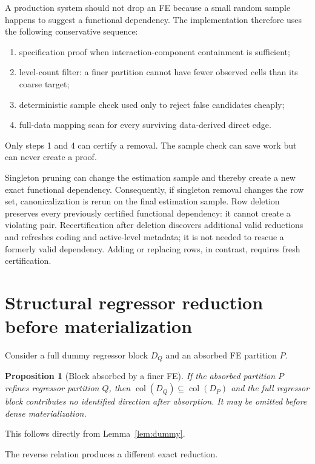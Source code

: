 \documentclass[11pt]{article}
\newtheorem{proposition}[theorem]{Proposition}
\theoremstyle{definition}
\newcommand{\col}{\operatorname{col}}
\newcommand{\1}{\mathbf{1}}
\begin{document}
A production system should not drop an FE because a small random sample happens to suggest a functional dependency. The implementation therefore uses the following conservative sequence:
\begin{enumerate}[label=\arabic*.]
  \item specification proof when interaction-component containment is sufficient;
  \item level-count filter: a finer partition cannot have fewer observed cells than its coarse target;
  \item deterministic sample check used only to reject false candidates cheaply;
  \item full-data mapping scan for every surviving data-derived direct edge.
\end{enumerate}
Only steps 1 and 4 can certify a removal. The sample check can save work but can never create a proof.

Singleton pruning can change the estimation sample and thereby create a new exact functional dependency. Consequently, if singleton removal changes the row set, canonicalization is rerun on the final estimation sample. Row deletion preserves every previously certified functional dependency: it cannot create a violating pair. Recertification after deletion discovers additional valid reductions and refreshes coding and active-level metadata; it is not needed to rescue a formerly valid dependency. Adding or replacing rows, in contrast, requires fresh certification.

\section{Structural regressor reduction before materialization}

Consider a full dummy regressor block $D_Q$ and an absorbed FE partition $P$.

\begin{proposition}[Block absorbed by a finer FE]\label{prop:absorb}
If the absorbed partition $P$ refines regressor partition $Q$, then $\col(D_Q)\subseteq\col(D_P)$ and the full regressor block contributes no identified direction after absorption. It may be omitted before dense materialization.
\end{proposition}
This follows directly from Lemma~\ref{lem:dummy}.

The reverse relation produces a different exact reduction.
\end{document}
